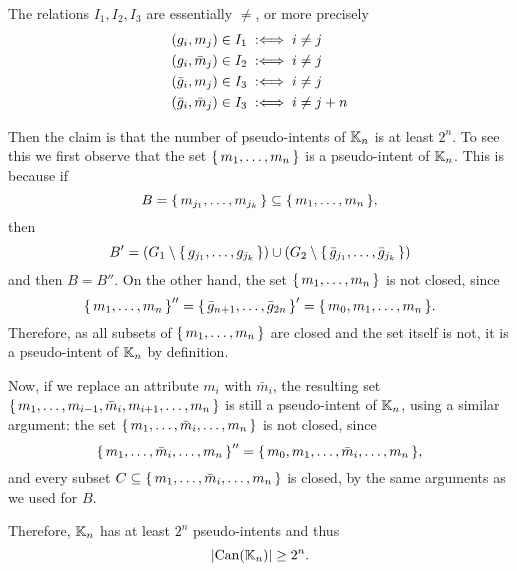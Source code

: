 \begin{Example}
  The relations $I_1, I_2, I_3$ are essentially $\neq$, or more precisely
  \begin{align*}
    (g_i, m_j) \in I_1           &\;:\Longleftrightarrow\; i \neq j\\
    (g_i, \bar m_j) \in I_2      &\;:\Longleftrightarrow\; i \neq j\\
    (\bar g_i, m_j) \in I_3      &\;:\Longleftrightarrow\; i \neq j\\
    (\bar g_i, \bar m_j) \in I_3 &\;:\Longleftrightarrow\; i \neq j + n
  \end{align*}

  Then the claim is that the number of pseudo-intents of ${\mathbb{K}}_n$ is at least $2^n$.  To
  see this we first observe that the set ${\{\, m_1, \dots, m_n \,\}}$ is a pseudo-intent of
  ${\mathbb{K}}_n$.  This is because if
  \begin{equation*}
    B = {\{\, m_{j_1}, \dots, m_{j_k} \,\}} \subseteq {\ensuremath{\{\, m_1, \dots, m_n \,\}}},
  \end{equation*}
  then
  \begin{equation*}
    B' = (G_1 \setminus {\ensuremath{\{\, g_{j_1}, \dots, g_{j_k} \,\}}}) \cup (G_2 \setminus {\ensuremath{\{\, \bar
      g_{j_1}, \dots, \bar g_{j_k} \,\}}})
  \end{equation*}
  and then $B = B''$.  On the other hand, the set ${\{\, m_1, \dots, m_n \,\}}$ is not closed, since
  \begin{equation*}
    {\ensuremath{\{\, m_1, \dots, m_n \,\}}}'' = {\{\, \bar g_{n+1}, \dots, \bar g_{2n} \,\}}' = {\{\, m_0,
      m_1, \dots, m_n \,\}}.
  \end{equation*}
  Therefore, as all subsets of ${\{\, m_1, \dots, m_n \,\}}$ are closed and the set itself is
  not, it is a pseudo-intent of ${\mathbb{K}}_n$ by definition.

  Now, if we replace an attribute $m_i$ with $\bar m_i$, the resulting set ${\{\, m_1,
    \dots, m_{i-1}, \bar m_i, m_{i+1}, \dots, m_n \,\}}$ is still a pseudo-intent of ${\mathbb{K}}_n$, using a similar argument: the set ${\{\, m_1, \dots, \bar m_i, \dots, m_n \,\}}$ is
  not closed, since
  \begin{equation*}
    {\ensuremath{\{\, m_1, \dots, \bar m_i, \dots, m_n \,\}}}'' = {\{\, m_0, m_1, \dots, \bar m_i, \dots,
      m_n \,\}},
  \end{equation*}
  and every subset $C \subseteq {\ensuremath{\{\, m_1, \dots, \bar m_i, \dots, m_n \,\}}}$ is closed, by
  the same arguments as we used for $B$.

  Therefore, ${\mathbb{K}}_n$ has at least $2^n$ pseudo-intents and thus
  \begin{equation*}
    \lvert \operatorname{Can}({\mathbb{K}}_n) \rvert \ge 2^n.
  \end{equation*}
\end{Example}

